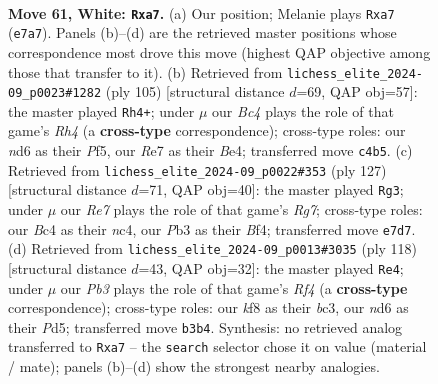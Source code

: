 \documentclass[11pt]{article}
\begin{document}
\clearpage

\begin{figure}[p]\centering
\begin{subfigure}{0.46\textwidth}\centering
\resizebox{\linewidth}{!}{%
\newchessgame
\chessboard[
  setfen={5k1r/p3R2p/P2n4/2r5/2B5/1Pp3KP/R1P3P1/8 w - - 2 61},
  showmover=false,
  pgfstyle=straightmove, color=movearrow, markmove={e7-a7}
]}
\caption{}
\end{subfigure}\hfill
\begin{subfigure}{0.46\textwidth}\centering
\resizebox{\linewidth}{!}{%
\newchessgame
\chessboard[
  setfen={8/8/p2k4/P2p1p1r/2pPbK2/2P5/3NR1P1/8 b - - 0 53},
  showmover=false,
  pgfstyle=straightmove, color=movearrow, markmove={h5-h4}
]}
\caption{}
\end{subfigure}
\\[4pt]
\begin{subfigure}{0.46\textwidth}\centering
\resizebox{\linewidth}{!}{%
\newchessgame
\chessboard[
  setfen={8/6p1/4p1kp/4P3/R1N2bP1/7P/2r3r1/3R3K b - - 49 64},
  showmover=false,
  pgfstyle=straightmove, color=movearrow, markmove={g2-g3}
]}
\caption{}
\end{subfigure}\hfill
\begin{subfigure}{0.46\textwidth}\centering
\resizebox{\linewidth}{!}{%
\newchessgame
\chessboard[
  setfen={8/7p/pp1kB2r/3P4/P4R2/2b1P3/1R2KP2/8 w - - 5 60},
  showmover=false,
  pgfstyle=straightmove, color=movearrow, markmove={f4-e4}
]}
\caption{}
\end{subfigure}
\caption{\textbf{Move 61, White: \texttt{Rxa7}.} (a) Our position; Melanie plays \texttt{Rxa7} (\texttt{e7a7}). Panels (b)--(d) are the retrieved master positions whose correspondence most drove this move (highest QAP objective among those that transfer to it). (b) Retrieved from \texttt{lichess\_elite\_2024-09\_p0023\#1282} (ply 105) [structural distance $d$=69, QAP obj=57]: the master played \texttt{Rh4+}; under $\mu$ our \emph{Bc4} plays the role of that game's \emph{Rh4} (a \textbf{cross-type} correspondence); cross-type roles: our \emph{n}d6 as their \emph{P}f5, our \emph{R}e7 as their \emph{B}e4; transferred move \texttt{c4b5}. (c) Retrieved from \texttt{lichess\_elite\_2024-09\_p0022\#353} (ply 127) [structural distance $d$=71, QAP obj=40]: the master played \texttt{Rg3}; under $\mu$ our \emph{Re7} plays the role of that game's \emph{Rg7}; cross-type roles: our \emph{B}c4 as their \emph{n}c4, our \emph{P}b3 as their \emph{B}f4; transferred move \texttt{e7d7}. (d) Retrieved from \texttt{lichess\_elite\_2024-09\_p0013\#3035} (ply 118) [structural distance $d$=43, QAP obj=32]: the master played \texttt{Re4}; under $\mu$ our \emph{Pb3} plays the role of that game's \emph{Rf4} (a \textbf{cross-type} correspondence); cross-type roles: our \emph{k}f8 as their \emph{b}c3, our \emph{n}d6 as their \emph{P}d5; transferred move \texttt{b3b4}. Synthesis: no retrieved analog transferred to \texttt{Rxa7} -- the \texttt{search} selector chose it on value (material / mate); panels (b)--(d) show the strongest nearby analogies.}
\label{fig:thought-m120}
\end{figure}
\end{document}
